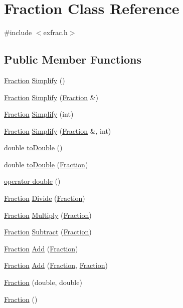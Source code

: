 \hypertarget{class_fraction}{}\section{Fraction Class Reference}
\label{class_fraction}


{\ttfamily \#include $<$exfrac.\+h$>$}

\subsection*{Public Member Functions}
\begin{DoxyCompactItemize}
\item 
\hyperlink{class_fraction}{Fraction} \hyperlink{class_fraction_a9fff1d8b1e30544197285625ffdf2192}{Simplify} ()
\item 
\hyperlink{class_fraction}{Fraction} \hyperlink{class_fraction_a14364276bad47fb80a0e5bd099ca6d87}{Simplify} (\hyperlink{class_fraction}{Fraction} \&)
\item 
\hyperlink{class_fraction}{Fraction} \hyperlink{class_fraction_a58029f7dec62b66dd49706776b5a3001}{Simplify} (int)
\item 
\hyperlink{class_fraction}{Fraction} \hyperlink{class_fraction_a1618fa2a6fa6af9a41fc9ecbe45ed180}{Simplify} (\hyperlink{class_fraction}{Fraction} \&, int)
\item 
double \hyperlink{class_fraction_ad5b00c4fd7a4e07ad713bd71be177f23}{to\+Double} ()
\item 
double \hyperlink{class_fraction_aa6a37abb82e7f5d49bb711408da2f79d}{to\+Double} (\hyperlink{class_fraction}{Fraction})
\item 
\hyperlink{class_fraction_a2db5fac665eb5350af01344cea878dac}{operator double} ()
\item 
\hyperlink{class_fraction}{Fraction} \hyperlink{class_fraction_a131d574b53000721cf37d8a349f5dfad}{Divide} (\hyperlink{class_fraction}{Fraction})
\item 
\hyperlink{class_fraction}{Fraction} \hyperlink{class_fraction_a305de823aed04f1d5bf439dd00a4f979}{Multiply} (\hyperlink{class_fraction}{Fraction})
\item 
\hyperlink{class_fraction}{Fraction} \hyperlink{class_fraction_a282dddf5b1040f271c7cda9652fa1528}{Subtract} (\hyperlink{class_fraction}{Fraction})
\item 
\hyperlink{class_fraction}{Fraction} \hyperlink{class_fraction_a5c975bd53b2f7475218244cb530f37e9}{Add} (\hyperlink{class_fraction}{Fraction})
\item 
\hyperlink{class_fraction}{Fraction} \hyperlink{class_fraction_aa72b444b9518520c5014ccf0d448fb39}{Add} (\hyperlink{class_fraction}{Fraction}, \hyperlink{class_fraction}{Fraction})
\item 
\hyperlink{class_fraction_a96312c71af5c36c6f0bdbf8b9ecefb55}{Fraction} (double, double)
\item 
\hyperlink{class_fraction_a29efaf0ef03cceab0bfa637e9eea2b7b}{Fraction} ()
\end{DoxyCompactItemize}

